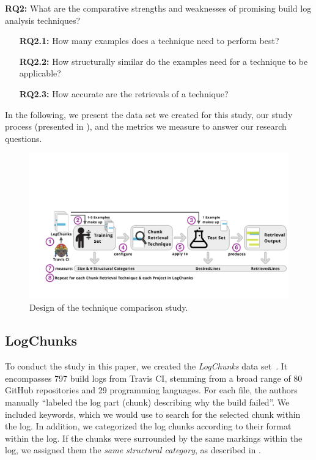 \begin{simplebox}[minipage boxed title*=-1.5cm,
attach boxed title to top center={yshift=-6mm}]
{\textbf{RQ2:} What are the comparative strengths and weaknesses
of promising build log analysis techniques?}
\begin{itemize}[leftmargin=1.2cm]
  \item[\textbf{RQ2.1:}] How many examples does a technique need to
  perform best?
  \item[\textbf{RQ2.2:}] How structurally similar do the examples
  need for a technique to be applicable?
  \item[\textbf{RQ2.3:}] How accurate are the retrievals of a technique?
\end{itemize}
\end{simplebox}

In the following, we present the data set we created for this study,
our study process (presented in ), and the metrics
we measure to answer our research questions.

\begin{figure}[tb]
	\centering
	\includegraphics[width=\textwidth, trim={1.6cm 1.6cm 0.2cm 5.6cm},
  clip]{img/study.pdf}
	\caption{Design of the technique comparison study.}
	\label{fig:study}
\end{figure}


\subsection{LogChunks}
To conduct the study in this paper, we created the
\emph{LogChunks}  data set~\cite{brandt2020logchunks}.
It encompasses 797 build logs from Travis CI,
stemming from a broad range of 80 GitHub repositories and 29
programming languages.
For each file, the authors manually ``labeled
the log part (chunk) describing why the build
failed''.
We included keywords, which we
would use to search for the selected chunk within the log.
In
addition, we categorized the log chunks according to their format
within the log.
If the chunks were surrounded by the same markings
within the log, we assigned them the \emph{same structural category},
as described in .

